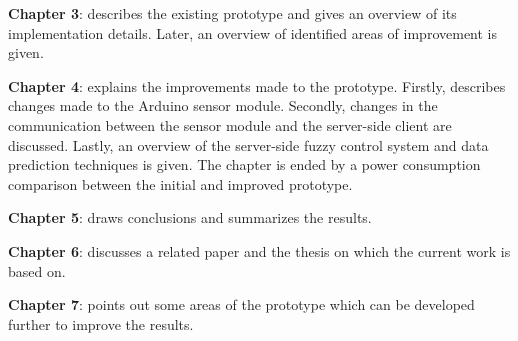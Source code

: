 \noindent \textbf{Chapter 3}: describes the existing prototype and gives an overview of its implementation details. Later, an overview of identified areas of improvement is given.
\newline

\noindent \textbf{Chapter 4}: explains the improvements made to the prototype. Firstly, describes changes made to the Arduino sensor module. Secondly, changes in the communication between the sensor module and the server-side client are discussed. Lastly, an overview of the server-side fuzzy control system and data prediction techniques is given. The chapter is ended by a power consumption comparison between the initial and improved prototype.
\newline

\noindent \textbf{Chapter 5}: draws conclusions and summarizes the results.
\newline

\noindent \textbf{Chapter 6}: discusses a related paper and the thesis on which the current work is based on.
\newline

\noindent \textbf{Chapter 7}: points out some areas of the prototype which can be developed further to improve the results.
\newline




